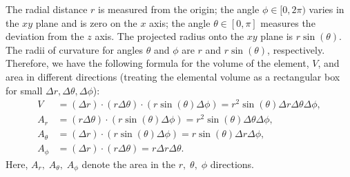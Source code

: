 \documentclass[12pt]{article}
\begin{document}
\begin{center}
\end{center}
The radial distance $r$ is measured from the origin; the angle $\phi\in[0,2\pi)$ varies in the $xy$ plane and is zero on the $x$ axis; the angle $\theta\in[0,\pi]$ measures the deviation from the $z$ axis. The projected radius onto the $xy$ plane is $r\sin(\theta)$. The radii of curvature for angles $\theta$ and $\phi$ are $r$ and $r\sin(\theta)$, respectively. Therefore, we have the following formula for the volume of the element, $V$, and area in different directions (treating the elemental volume as a rectangular box for small $\Delta r,\Delta\theta,\Delta\phi$):
  \begin{align*}
    V&=(\Delta r)\cdot(r\Delta\theta)\cdot(r\sin(\theta)\Delta\phi)=r^2\sin(\theta)\Delta r\Delta\theta\Delta\phi,\\
    A_r&=(r\Delta\theta)\cdot(r\sin(\theta)\Delta\phi)=r^2\sin(\theta)\Delta\theta\Delta\phi,\\
    A_{\theta}&=(\Delta r)\cdot(r\sin(\theta)\Delta\phi)=r\sin(\theta)\Delta r\Delta\phi,\\
    A_{\phi}&=(\Delta r)\cdot(r\Delta\theta)=r\Delta r\Delta\theta.
  \end{align*}
  Here, $A_{r},\;A_{\theta},\;A_{\phi}$ denote the area in the $r,\;\theta,\;\phi$ directions.
\end{document}
